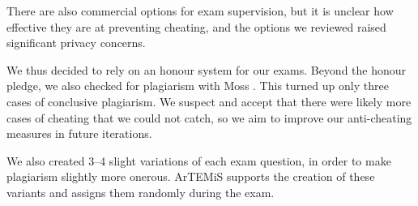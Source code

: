 There are also commercial options for exam supervision,
but it is unclear how effective they are at preventing cheating, and the options we reviewed raised significant privacy concerns.

We thus decided to rely on an honour system for our exams.
Beyond the honour pledge,
we also checked for plagiarism with Moss .
This turned up only three cases of conclusive plagiarism.
We suspect and accept that there were likely more cases of cheating that we could not catch,
so we aim to improve our anti-cheating measures in future iterations.

We also created 3--4 slight variations of each exam question, in order to make plagiarism slightly more onerous. ArTEMiS supports the creation of these variants and assigns them randomly during the exam.
